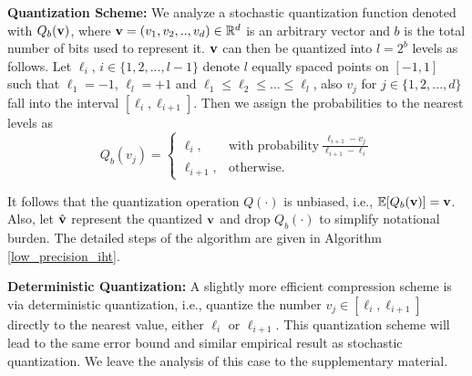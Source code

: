 \documentclass[aoas,preprint]{imsart}
\numberwithin{equation}{section}
\theoremstyle{plain}
\begin{document}
\vspace{0.5em}
{\bf Quantization Scheme:} We analyze a stochastic quantization function denoted with $Q_b({\bf v})$, where ${\bf v}=(v_1, v_2, .., v_d) \in \mathbb{R}^d$ is an arbitrary vector and $b$ is the total number of bits used to represent it. ${\bf v}$ can then be quantized into $l=2^b$ levels as follows. Let $\ell_i$, $i\in \{1, 2, ..., l-1 \}$ denote $l$ equally spaced points on $[-1, 1]$ such that $\ell_1= -1$, $\ell_l= +1$ and $\ell_1\leq\ell_2 \leq ... \leq \ell_l$, also $v_j$ for $j\in \{1, 2, ..., d \}$ fall into the interval $[\ell_i, \ell_{i+1}]$. Then we assign the probabilities to the nearest levels as
\[
    Q_b(v_j) = \left\{\begin{array}{lr}
        \ell_i, & \textrm{with probability} \ \frac{\ell_{i+1}-v_j}{\ell_{i+1}-\ell_i}\\
        \ell_{i+1},&\textrm{otherwise}.  \ \ \ \  \ \ \ \ \ \ \ \ \ \ \ \ \ \ 
        \end{array}
\]
  
It follows that the quantization operation $Q(\cdot)$ is unbiased, i.e., $\mathbb{E}[Q_b({\bf v})] = {\bf v}$. Also, let $\hat{{\bf v}}$ represent the quantized ${\bf v}$ and drop $Q_b(\cdot)$ to simplify notational burden. The detailed steps of the algorithm are given in Algorithm \ref{low_precision_iht}.

\vspace{0.5em}
{\bf Deterministic Quantization:} A slightly more efficient compression scheme is via deterministic quantization, i.e., quantize the number
$v_j \in [\ell_i, \ell_{i+1}]$ directly to the nearest
value, either $\ell_i$ or $\ell_{i+1}$. 
This quantization scheme will lead to the same 
error bound and similar empirical result as stochastic quantization. {We leave the analysis
of this case to the supplementary material.}
\end{document}
